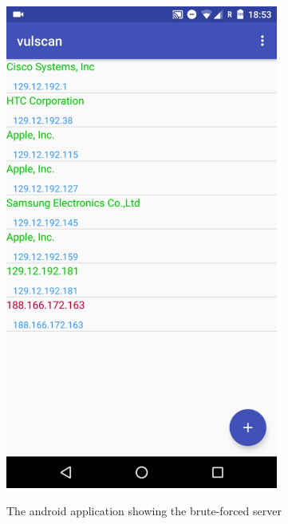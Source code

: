 \documentclass{report}
\begin{document}
\begin{figure}[h]
 \caption{The android application showing the brute-forced server}
 \centering
 \includegraphics[width=0.8\textwidth]{./img/exp/screen-test-and}
 \label{fig:test-and-serv}
\end{figure}
\end{document}
